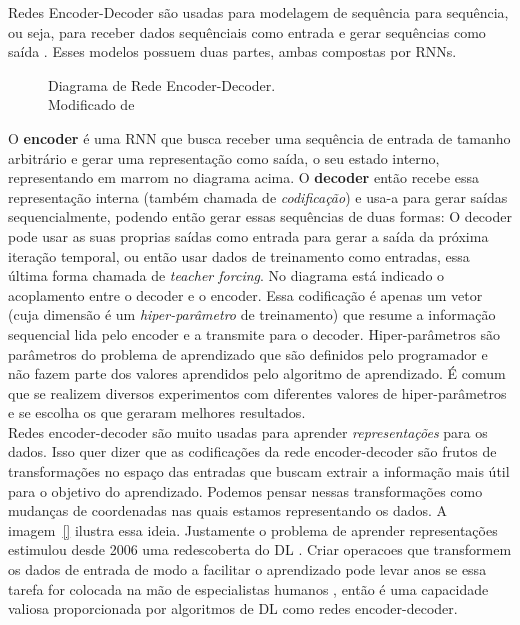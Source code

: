 Redes Encoder-Decoder são usadas para modelagem de sequência para
sequência, ou seja, para receber dados sequênciais como entrada e gerar
sequências como saída \citep{dlbook}. Esses modelos possuem duas partes, ambas compostas por
RNNs. \\

\begin{figure}[H]
\centering

\caption{ Diagrama de Rede Encoder-Decoder.\\ Modificado de \cite{encdec}}

\end{figure}
  
O \textbf{encoder} é uma RNN que busca receber uma sequência de entrada de
tamanho arbitrário e gerar uma representação como saída, o seu estado interno,
representando em marrom no diagrama acima. O \textbf{decoder} então recebe essa representação interna (também chamada
de \textit{codificação}) e usa-a para gerar saídas sequencialmente, podendo
então gerar essas sequências de duas formas: O decoder pode usar as suas proprias saídas
como entrada para gerar a saída da próxima iteração temporal, ou então usar dados de treinamento como
entradas, essa última forma chamada de \textit{teacher forcing}. No diagrama
está indicado o acoplamento entre o decoder e o encoder. Essa codificação é apenas
um vetor (cuja dimensão é um \textit{hiper-parâmetro} de treinamento) que resume a
informação sequencial lida pelo encoder e a transmite para o decoder.
Hiper-parâmetros são parâmetros do problema de aprendizado que são definidos
pelo programador e não fazem parte dos valores aprendidos pelo algoritmo de
aprendizado. É comum que se realizem diversos experimentos com diferentes
valores de hiper-parâmetros e se escolha os que geraram melhores resultados. 
\\

Redes encoder-decoder são muito usadas para aprender \textit{representações} para os
dados. Isso quer dizer que as codificações da rede encoder-decoder são frutos de
transformações no espaço das entradas que buscam extrair a informação mais útil
para o objetivo do aprendizado. Podemos pensar nessas transformações como
mudanças de coordenadas nas quais estamos representando os dados. A
imagem~\ref{} ilustra essa ideia. Justamente o problema de aprender
representações estimulou desde 2006 uma redescoberta do DL \citep{dlbook}. Criar
operacoes que transformem os dados de entrada de modo a facilitar o aprendizado
pode levar anos se essa tarefa for colocada na mão de especialistas humanos
\citep{dlbook}, então é uma capacidade valiosa proporcionada por algoritmos de
DL como redes encoder-decoder. \\
\\




